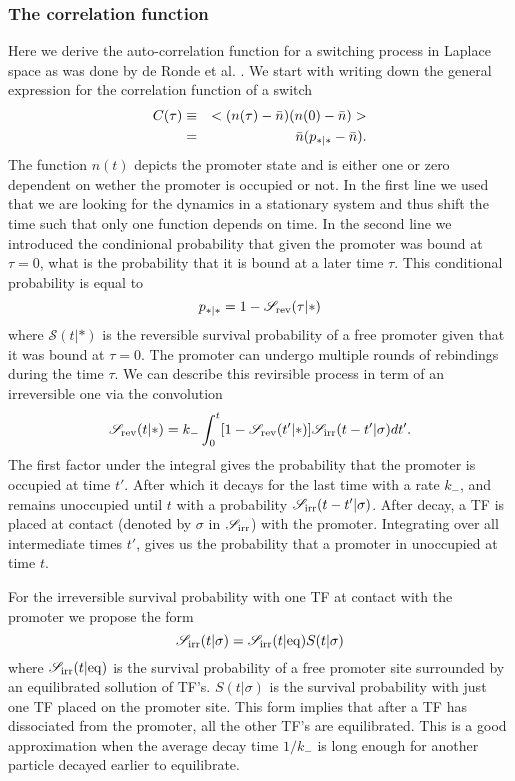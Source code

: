 \subsubsection{The correlation function}
Here we derive the auto-correlation function for a switching process in Laplace space as was done by de Ronde et al. \cite{DeRonde2012}. We start with writing down the general expression for the correlation function of a switch
\begin{eqnarray}
 C(\tau) & \equiv & < (n(\tau) - \bar{n})(n(0) - \bar{n}) > \\
  	& = & \bar{n}(p_{*|*}-\bar{n}).
 \elabel{corr_func}
\end{eqnarray}
The function $n(t)$ depicts the promoter state and is either one or zero dependent on wether the promoter is occupied or not. In the first line we used that we are looking for the dynamics in a stationary system and thus shift the time such that only one function depends on time. In the second line we introduced the condinional probability that given the promoter was bound at $\tau=0$, what is the probability that it is bound at a later time $\tau$. This conditional probability is equal to
\begin{equation}
 p_{*|*} = 1 - \mathscr{S}_{\rm rev}(\tau|*)
\end{equation}
where $\mathscr{S}(t|*)$ is the reversible survival probability of a free promoter given that it was bound at $\tau=0$. The promoter can undergo multiple rounds of rebindings during the time $\tau$. We can describe this revirsible process in term of an irreversible one via the convolution \cite{Agmon1990}
\begin{equation}
 \mathscr{S}_{\rm rev}(t|*) = k_- \int_0^t [1-\mathscr{S}_{\rm rev}(t'|*)]\mathscr{S}_{\rm irr}(t-t'|\sigma)dt'.
 \elabel{rev_conv}
\end{equation}
The first factor under the integral gives the probability that the promoter is occupied at time $t'$. After which it decays for the last time with a rate $k_-$, and remains unoccupied until $t$ with a probability $\mathscr{S}_{\rm irr}(t-t'|\sigma)$. After decay, a TF is placed at contact (denoted by $\sigma$ in $\mathscr{S}_{\rm irr}$) with the promoter. Integrating over all intermediate times $t'$, gives us the probability that a promoter in unoccupied at time $t$. 

For the irreversible survival probability with one TF at contact with the promoter we propose the form
\begin{equation}
 \mathscr{S}_{\rm irr}(t|\sigma) = \mathscr{S}_{\rm irr}(t|{\rm eq}) S(t|\sigma)
 \elabel{Def_Ssi}
\end{equation}
where $\mathscr{S}_{\rm irr}(t|{\rm eq})$ is the survival probability of a free promoter site surrounded by an equilibrated sollution of TF's. $S(t|\sigma)$ is the survival probability with just one TF placed on the promoter site. This form implies that after a TF has dissociated from the promoter, all the other TF's are equilibrated. This is a good approximation when the average decay time $1/k_-$ is long enough for another particle decayed earlier to equilibrate. 

